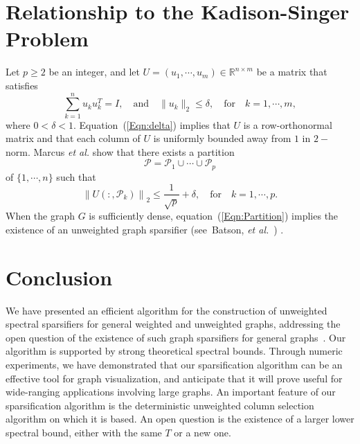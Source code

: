 \documentclass[final,leqno,onefignum,onetabnum]{siamltex1213}
\begin{document}
\section{Relationship to the Kadison-Singer Problem} 
Let $p \geq 2$ be an integer, and let $ U = \left(u_1, \cdots,
u_m\right) \in \mathbb{R}^{n\times m}$ be a matrix that satisfies
\begin{equation}
\sum_{k=1}^n u_k u_k^T  =  I, \quad \mbox{and} \quad 
\|u_k\|_2  \leq  \delta, \quad \mbox{for}\quad k = 1, \cdots, m, \label{Eqn:delta}
\end{equation}
where $0 < \delta < 1$. Equation~(\ref{Eqn:delta}) implies that $U$ is
a row-orthonormal matrix and that each column of $U$ is uniformly
bounded away from $1$ in $2-$norm. Marcus {\em et al.} \cite{Marcus2014} show that there exists a partition 
\begin{equation}
{\displaystyle \mathcal{P} = \mathcal{P}_1 \cup \cdots \cup \mathcal{P}_p } \label{Eqn:Partition}
\end{equation}
of ${\displaystyle \{1, \cdots , n\}}$ such that 
\begin{equation}
{\displaystyle \left\|U\left(:,\mathcal{P}_k\right)\right\|_2 \leq \frac{1}{\sqrt{p}} + \delta, \quad \mbox{for}\quad k = 1, \cdots, p.}\nonumber \end{equation}
When the graph $G$ is sufficiently dense, equation~(\ref{Eqn:Partition}) implies the existence of an unweighted graph sparsifier (see~Batson, {\em et al.}~\cite{ramanujansparse}) .

\section{Conclusion} We have presented an efficient algorithm for the construction of unweighted spectral sparsifiers for general weighted and unweighted graphs, addressing the open question of the existence of such graph sparsifiers for general graphs~\cite{ramanujansparse}.  Our algorithm is supported by strong theoretical spectral bounds.  Through numeric experiments, we have demonstrated that our sparsification algorithm can be an effective tool for graph visualization, and anticipate that it will prove useful for wide-ranging applications involving large graphs.  An important feature of our sparsification algorithm is the deterministic unweighted column selection algorithm on which it is based.  An open question is the existence of a larger lower spectral bound, either with the same $T$ or a new one.\\



\end{document}
